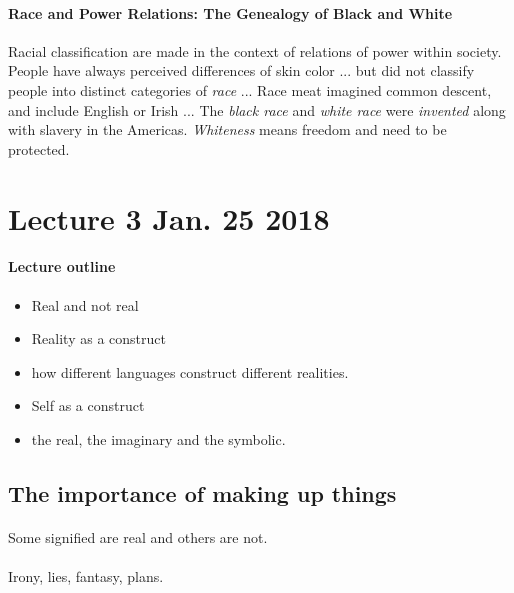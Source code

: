 \documentclass{article}
\begin{document}
	\paragraph{Race and Power Relations: The Genealogy of Black and White} \quad
	\newline Racial classification are made in the context of relations of power within society.
	\newline People have always perceived differences of skin color ...
	\newline but did not classify people into distinct categories of \emph{race} ...
	\newline Race meat imagined common descent, and include English or Irish ...
	\newline The \emph{black race} and \emph{white race} were \emph{invented} along with slavery in the Americas.
	\newline \emph{Whiteness} means freedom and need to be protected.
	
	\section{Lecture 3 Jan. 25 2018}
	\paragraph{Lecture outline}
	\begin{itemize}
    	\item Real and not real
    	\item Reality as a construct
    	\item {} how different languages construct different realities.
    	\item Self as a construct
    	\item {} the real, the imaginary and the symbolic.
	\end{itemize}
	\subsection{The importance of making up things}
	\paragraph{} Some signified are real and others are not.
	\paragraph{} Irony, lies, fantasy, plans.
\end{document}
